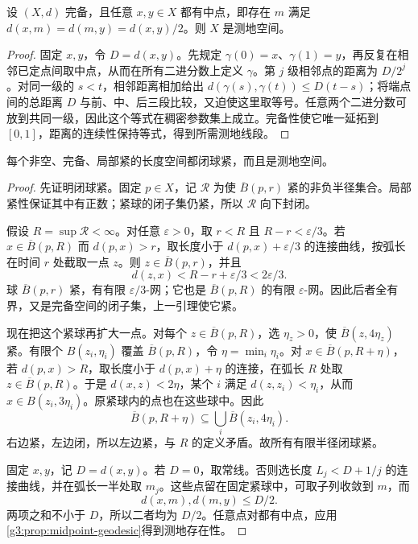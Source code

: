 \begin{proposition}\label{g3:prop:midpoint-geodesic}
	设 \((X,d)\) 完备，且任意 \(x,y\in X\) 都有中点，即存在 \(m\) 满足 \(d(x,m)=d(m,y)=d(x,y)/2\)。则 \(X\) 是测地空间。
\end{proposition}
\begin{proof}
	固定 \(x,y\)，令 \(D=d(x,y)\)。先规定 \(\gamma(0)=x\)、\(\gamma(1)=y\)，再反复在相邻已定点间取中点，从而在所有二进分数上定义 \(\gamma\)。第 \(j\) 级相邻点的距离为 \(D/2^j\)。对同一级的 \(s<t\)，相邻距离相加给出 \(d(\gamma(s),\gamma(t))\le D(t-s)\)；将端点间的总距离 \(D\) 与前、中、后三段比较，又迫使这里取等号。任意两个二进分数可放到共同一级，因此这个等式在稠密参数集上成立。完备性使它唯一延拓到 \([0,1]\)，距离的连续性保持等式，得到所需测地线段。
\end{proof}

\begin{theorem}\label{g3:thm:metric-hopf-rinow}
	每个非空、完备、局部紧的长度空间都闭球紧，而且是测地空间。
\end{theorem}
\begin{proof}
	先证明闭球紧。固定 \(p\in X\)，记 \(\mathcal R\) 为使 \(\overline B(p,r)\) 紧的非负半径集合。局部紧性保证其中有正数；紧球的闭子集仍紧，所以 \(\mathcal R\) 向下封闭。

	假设 \(R=\sup\mathcal R<\infty\)。对任意 \(\varepsilon>0\)，取 \(r<R\) 且 \(R-r<\varepsilon/3\)。若 \(x\in\overline B(p,R)\) 而 \(d(p,x)>r\)，取长度小于 \(d(p,x)+\varepsilon/3\) 的连接曲线，按弧长在时间 \(r\) 处截取一点 \(z\)。则 \(z\in\overline B(p,r)\)，并且
	\[
		d(z,x)<R-r+\varepsilon/3<2\varepsilon/3.
	\]
	球 \(\overline B(p,r)\) 紧，有有限 \(\varepsilon/3\)-网；它也是 \(\overline B(p,R)\) 的有限 \(\varepsilon\)-网。因此后者全有界，又是完备空间的闭子集，上一引理使它紧。

	现在把这个紧球再扩大一点。对每个 \(z\in\overline B(p,R)\)，选 \(\eta_z>0\)，使 \(\overline B(z,4\eta_z)\) 紧。有限个 \(B(z_i,\eta_i)\) 覆盖 \(\overline B(p,R)\)，令 \(\eta=\min_i\eta_i\)。对 \(x\in\overline B(p,R+\eta)\)，若 \(d(p,x)>R\)，取长度小于 \(d(p,x)+\eta\) 的连接，在弧长 \(R\) 处取 \(z\in\overline B(p,R)\)。于是 \(d(x,z)<2\eta\)，某个 \(i\) 满足 \(d(z,z_i)<\eta_i\)，从而 \(x\in B(z_i,3\eta_i)\)。原紧球内的点也在这些球中。因此
	\[
		\overline B(p,R+\eta)\subseteq\bigcup_i\overline B(z_i,4\eta_i).
	\]
	右边紧，左边闭，所以左边紧，与 \(R\) 的定义矛盾。故所有有限半径闭球紧。

	固定 \(x,y\)，记 \(D=d(x,y)\)。若 \(D=0\)，取常线。否则选长度 \(L_j<D+1/j\) 的连接曲线，并在弧长一半处取 \(m_j\)。这些点留在固定紧球中，可取子列收敛到 \(m\)，而
	\[
		d(x,m),d(m,y)\le D/2.
	\]
	两项之和不小于 \(D\)，所以二者均为 \(D/2\)。任意点对都有中点，应用\cref{g3:prop:midpoint-geodesic}得到测地存在性。
\end{proof}

